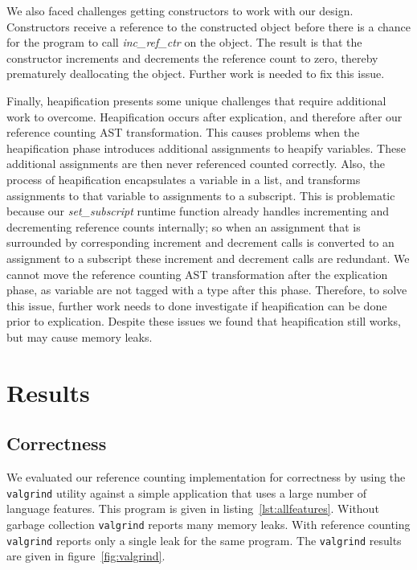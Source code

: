 \documentclass{sigplanconf}
\newcommand{\afunction}[1]{\textit{#1}}
\begin{document}
We also faced challenges getting constructors to work with our design.  Constructors receive a reference to the constructed object before there is a chance for the program to call \afunction{inc\_ref\_ctr} on the object.  The result is that the constructor increments and decrements the reference count to zero, thereby prematurely deallocating the object.  Further work is needed to fix this issue.

Finally, heapification presents some unique challenges that require additional work to overcome.  Heapification occurs after explication, and therefore after our reference counting AST transformation.  This causes problems when the heapification phase introduces additional assignments to heapify variables.  These additional assignments are then never referenced counted correctly.  Also, the process of heapification encapsulates a variable in a list, and transforms assignments to that variable to assignments to a subscript.  This is problematic because our \afunction{set\_subscript} runtime function already handles incrementing and decrementing reference counts internally; so when an assignment that is surrounded by corresponding increment and decrement calls is converted to an assignment to a subscript these increment and decrement calls are redundant.  We cannot move the reference counting AST transformation after the explication phase, as variable are not tagged with a type after this phase.  Therefore, to solve this issue, further work needs to done investigate if heapification can be done prior to explication.  Despite these issues we found that heapification still works, but may cause memory leaks.

\section{Results}
\label{sec:results}

\subsection{Correctness}
We evaluated our reference counting implementation for correctness by using the \texttt{valgrind} utility against a simple application that uses a large number of language features.  This program is given in listing~\ref{lst:allfeatures}.  Without garbage collection \texttt{valgrind} reports many memory leaks.  With reference counting \texttt{valgrind} reports only a single leak for the same program.  The \texttt{valgrind} results are given in figure~\ref{fig:valgrind}.
\end{document}

